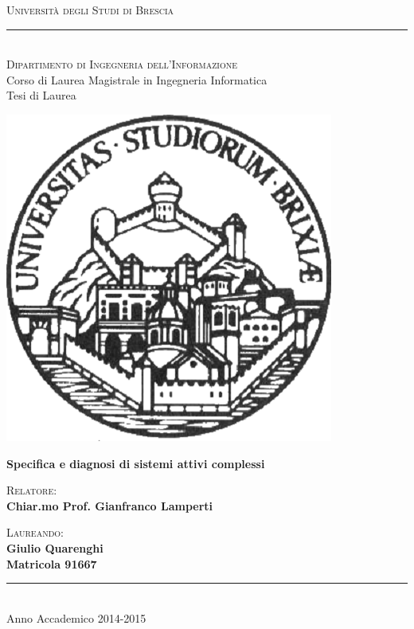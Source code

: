 \documentclass[12pt,a4paper,oneside]{book}
\begin{document}
\begin{titlepage}
\begin{center}
{{\Large{\textsc{Università degli Studi di Brescia}}}\\
\rule{0.5\textwidth}{0.1mm}
\vspace{10mm}
\textsc{\\Dipartimento di Ingegneria dell'Informazione\\}
Corso di Laurea Magistrale in Ingegneria Informatica\\
\vspace{10mm}
Tesi di Laurea}


\end{center}
\vspace{10mm}
\begin{center}
\includegraphics[width=.3\columnwidth]{../Logo/logo.png}
\end{center}
\vspace{10mm}

\begin{center}
{\LARGE{\textbf{Specifica e diagnosi di sistemi attivi complessi}}}
\end{center}
\vspace{5mm}
\par
\noindent
\begin{minipage}[t]{0.57\textwidth}
\vspace{10mm}
{{\textsc{Relatore:}\\
\textbf{Chiar.mo Prof. Gianfranco Lamperti}
}}
\end{minipage}
\hfill
\begin{minipage}[t]{0.3\textwidth}
{{\vspace{25mm}
\textsc{Laureando:}\\
\textbf {Giulio Quarenghi\\
Matricola 91667}\\

}}
\end{minipage}
\vspace{25mm}

\begin{center}
\rule{0.5\textwidth}{0.1mm}\\
\vspace{10mm}
{\large{ Anno Accademico 2014-2015}}%
\end{center}
\end{titlepage}
\end{document}
